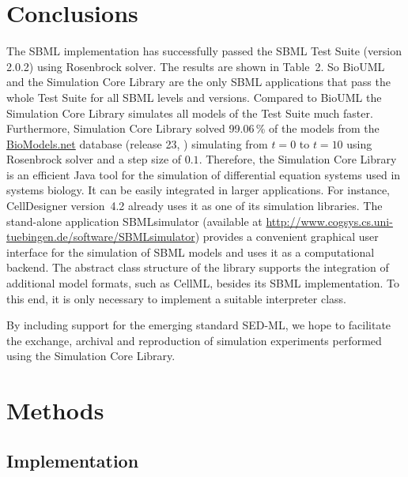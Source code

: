 \documentclass[10pt]{bmc_article}
\newenvironment{bmcformat}{\baselineskip20pt\sloppy\setboolean{publ}{false}}{\baselineskip20pt\sloppy}
\begin{document}
\begin{bmcformat}
\section*{Conclusions}
The SBML implementation has successfully passed the
SBML Test Suite (version 2.0.2) using Rosenbrock solver. The results are shown in Table~2. So BioUML and the Simulation Core Library are the only SBML applications that pass the whole Test Suite for all SBML levels and versions. Compared to BioUML the Simulation Core Library simulates all models of the Test Suite much faster.
Furthermore, Simulation Core Library solved 99.06\,\% of the models from the
\href{http://biomodels.net}{BioModels.net} database (release 23,
\cite{Novere2006a}) simulating from $t=0$ to $t=10$ using Rosenbrock solver and a step size of $0.1$.
Therefore, the Simulation Core Library is an efficient Java tool for the
simulation of differential equation systems used in systems biology. It can be
easily integrated in larger applications. For instance,
CellDesigner version~4.2 \cite{Funahashi2003} already uses it as one of its simulation libraries.
The stand-alone application SBMLsimulator (available at
\href{http://www.cogsys.cs.uni-tuebingen.de/software/SBMLsimulator}{http://www.cogsys.cs.uni-tuebingen.de/software/SBMLsimulator})
provides a convenient graphical user interface for the simulation of SBML
models and uses it as a computational backend.
The abstract class structure of the library supports the integration of
additional model formats, such as CellML, besides its SBML implementation. To
this end, it is only necessary to implement a suitable interpreter class.


By including support for the emerging standard SED-ML, we hope to facilitate the
exchange, archival and reproduction of simulation experiments performed using
the Simulation Core Library.

\section*{Methods}

\subsection*{Implementation}


\end{bmcformat}
\end{document}
